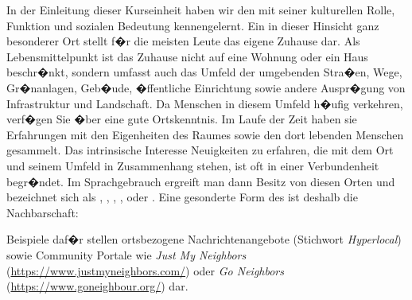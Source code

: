 In der Einleitung dieser Kurseinheit haben wir den  mit seiner kulturellen Rolle, Funktion und sozialen Bedeutung kennengelernt. Ein in dieser Hinsicht ganz besonderer Ort stellt f�r die meisten Leute das eigene Zuhause dar. Als Lebensmittelpunkt ist das Zuhause nicht auf eine Wohnung oder ein Haus beschr�nkt, sondern umfasst auch das Umfeld der umgebenden Stra�en, Wege, Gr�nanlagen, Geb�ude, �ffentliche Einrichtung sowie andere Auspr�gung von Infrastruktur und Landschaft. 
Da Menschen in diesem Umfeld h�ufig verkehren, verf�gen Sie �ber eine gute Ortskenntnis. Im Laufe der Zeit haben sie Erfahrungen mit den Eigenheiten des Raumes sowie den dort lebenden Menschen gesammelt. Das intrinsische Interesse Neuigkeiten zu erfahren, die mit dem Ort und seinem Umfeld in Zusammenhang stehen, ist oft in einer Verbundenheit begr�ndet. Im Sprachgebrauch ergreift man dann Besitz von diesen Orten und bezeichnet sich als , , , ,  oder . Eine gesonderte Form des  ist deshalb die Nachbarschaft: 


Beispiele daf�r stellen ortsbezogene Nachrichtenangebote (Stichwort \textit{Hyperlocal}) sowie Community Portale wie \textit{Just My Neighbors} (\url{https://www.justmyneighbors.com/}) oder \textit{Go Neighbors} (\url{https://www.goneighbour.org/}) dar.


